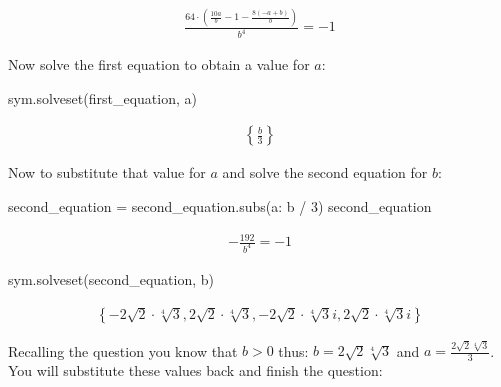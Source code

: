 \begin{equation*}
\begin{split}\displaystyle \frac{64 \cdot \left(\frac{10 a}{b} - 1 - \frac{8 \left(- a + b\right)}{b}\right)}{b^{4}} = -1\end{split}
\end{equation*}




Now solve the first equation to obtain a value for \(a\):




\begin{pyin}
sym.solveset(first_equation, a)
\end{pyin}




\begin{equation*}
\begin{split}\displaystyle \left\{\frac{b}{3}\right\}\end{split}
\end{equation*}




Now to substitute that value for \(a\) and solve the second equation for \(b\):




\begin{pyin}
second_equation = second_equation.subs({a: b / 3})
second_equation
\end{pyin}




\begin{equation*}
\begin{split}\displaystyle - \frac{192}{b^{4}} = -1\end{split}
\end{equation*}






\begin{pyin}
sym.solveset(second_equation, b)
\end{pyin}




\begin{equation*}
\begin{split}\displaystyle \left\{- 2 \sqrt{2} \cdot \sqrt[4]{3}, 2 \sqrt{2} \cdot \sqrt[4]{3}, - 2 \sqrt{2} \cdot \sqrt[4]{3} i, 2 \sqrt{2} \cdot \sqrt[4]{3} i\right\}\end{split}
\end{equation*}




Recalling the question you know that \(b>0\) thus: \(b = 2\sqrt{2}\sqrt[4]{3}\) and
\(a=\frac{2\sqrt{2}\sqrt[4]{3}}{3}\).
You will substitute these values back and finish the question:


